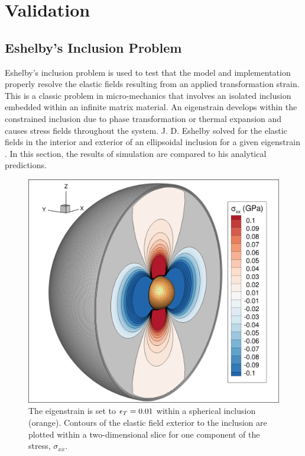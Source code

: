 \section{Validation}

\subsection{Eshelby's Inclusion Problem}

Eshelby's inclusion problem is used to test that the model and implementation properly resolve the elastic fields resulting from an applied transformation strain. This is a classic problem in micro-mechanics that involves an isolated inclusion embedded within an infinite matrix material. An eigenstrain develops within the constrained inclusion due to phase transformation or thermal expansion and causes stress fields throughout the system. J. D. Eshelby solved for the elastic fields in the interior and exterior of an ellipsoidal inclusion for a given eigenstrain \cite{Eshelby1957, Eshelby1959} . In this section, the results of simulation are compared to his analytical predictions. 



\begin{figure}[h!]
	\begin{center}
	\includegraphics[width=0.6\columnwidth]{ch-fracture/eshelby/inclusion}	
	\caption{The eigenstrain is set to $\epsilon_T=0.01$ within a spherical inclusion (orange). Contours of the elastic field exterior to the inclusion are plotted within a two-dimensional slice for one component of the stress, $\sigma_{xx}$.}
	\label{fig:eshelby_3d}
	\end{center}
\end{figure}

